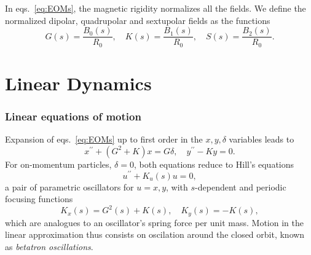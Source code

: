 In eqs.~\eqref{eq:EOMs}, the magnetic rigidity normalizes all the fields. We define the normalized dipolar, quadrupolar and sextupolar fields as the functions
\begin{equation}
    G(s) = \frac{B_0(s)}{R_0}, \quad K(s) = \frac{B_1(s)}{R_0}, \quad S(s) = \frac{B_2(s)}{R_0}.
    \label{eq:mag_funcs}
\end{equation}

\section{Linear Dynamics}
\subsubsection{Linear equations of motion}
Expansion of eqs.~\eqref{eq:EOMs} up to first order in the $x, y, \delta$ variables leads to \cite{sands_physics_1969}
    \begin{equation}
        x^{\prime\prime}+(G^2+K)x=G\delta, \quad
        y^{\prime\prime}-Ky=0.
        \label{eq:linearEOM}
    \end{equation}
    For on-momentum particles, $\delta=0$, both equations reduce to Hill's equations
    \begin{equation}
        u^{\prime\prime}+K_u(s)u = 0,
        \label{eq:Hill}
    \end{equation}
    a pair of parametric oscillators for $u=x,y$, with $s$-dependent and periodic focusing functions
         $$K_x(s) = G^2(s) + K(s), \quad K_y(s) = - K(s),$$
    which are analogues to an oscillator's spring force per unit mass. Motion in the linear approximation thus consists on oscilation around the closed orbit, known as \textit{betatron oscillations}.
